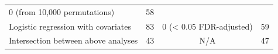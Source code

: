 \documentclass[]{article}
\begin{document}
\begin{longtable}[]{@{}lccc@{}}
\begin{minipage}[t]{0.24\columnwidth}
0 (from 10,000 permutations)\strut
\end{minipage} & \begin{minipage}[t]{0.18\columnwidth}\centering\strut
58\strut
\end{minipage}\tabularnewline
\begin{minipage}[t]{0.28\columnwidth}\raggedright\strut
Logistic regression with covariates\strut
\end{minipage} & \begin{minipage}[t]{0.19\columnwidth}\centering\strut
83\strut
\end{minipage} & \begin{minipage}[t]{0.24\columnwidth}\centering\strut
0 (\textless{} 0.05 FDR-adjusted)\strut
\end{minipage} & \begin{minipage}[t]{0.18\columnwidth}\centering\strut
59\strut
\end{minipage}\tabularnewline
\begin{minipage}[t]{0.28\columnwidth}\raggedright\strut
Intersection between above analyses\strut
\end{minipage} & \begin{minipage}[t]{0.19\columnwidth}\centering\strut
43\strut
\end{minipage} & \begin{minipage}[t]{0.24\columnwidth}\centering\strut
N/A\strut
\end{minipage} & \begin{minipage}[t]{0.18\columnwidth}\centering\strut
47\strut
\end{minipage}\tabularnewline
\bottomrule
\end{longtable}
\end{document}
